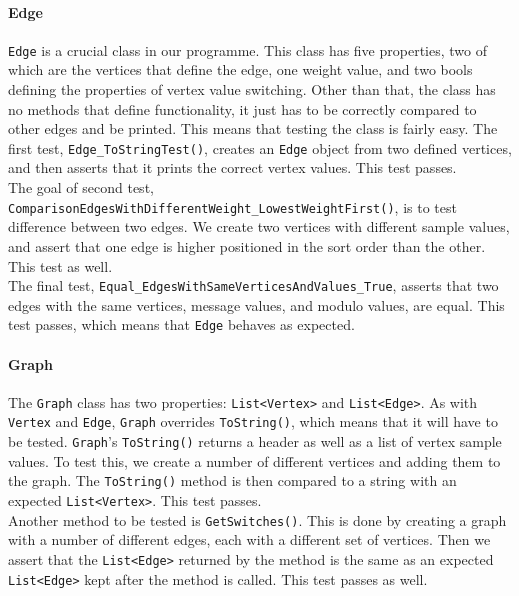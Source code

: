 \paragraph*{Edge}
\lstinline|Edge| is a crucial class in our programme.
This class has five properties, two of which are the vertices that define the edge, one weight value, and two bools defining the properties of vertex value switching.
Other than that, the class has no methods that define functionality, it just has to be correctly compared to other edges and be printed.
This means that testing the class is fairly easy.
The first test, \lstinline|Edge_ToStringTest()|, creates an \lstinline|Edge| object from two defined vertices, and then asserts that it prints the correct vertex values.
This test passes.\\
The goal of second test, \lstinline|ComparisonEdgesWithDifferentWeight_LowestWeightFirst()|, is to test difference between two edges.
We create two vertices with different sample values, and assert that one edge is higher positioned in the sort order than the other.
This test as well.\\
The final test, \lstinline|Equal_EdgesWithSameVerticesAndValues_True|, asserts that two edges with the same vertices, message values, and modulo values, are equal.
This test passes, which means that \lstinline|Edge| behaves as expected.

\paragraph*{Graph}
The \lstinline|Graph| class has two properties: \lstinline|List<Vertex>| and \lstinline|List<Edge>|.
As with \lstinline|Vertex| and \lstinline|Edge|, \lstinline|Graph| overrides \lstinline|ToString()|, which means that it will have to be tested.
\lstinline|Graph|'s \lstinline|ToString()| returns a header as well as a list of vertex sample values.
To test this, we create a number of different vertices and adding them to the graph.
The \lstinline|ToString()| method is then compared to a string with an expected \lstinline|List<Vertex>|.
This test passes.\\
Another method to be tested is \lstinline|GetSwitches()|.
This is done by creating a graph with a number of different edges, each with a different set of vertices.
Then we assert that the \lstinline|List<Edge>| returned by the method is the same as an expected \lstinline|List<Edge>| kept after the method is called.
This test passes as well.

